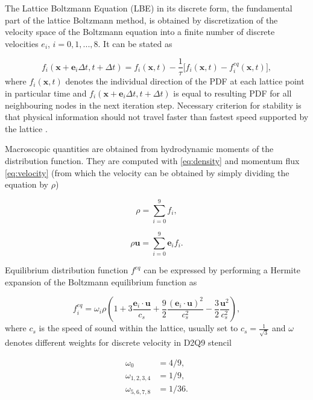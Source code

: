 The Lattice Boltzmann Equation (LBE) in its discrete form, the fundamental part of the lattice Boltzmann method, is obtained by discretization of the velocity space of the Boltzmann equation into a finite number of discrete velocities $e_i$, $i = 0,1,...,8$. It can be stated as

\begin{equation}
	\label{eq:lbe-bgk}
	f_i (\bm{x}+\bm{e}_i\Delta t,t+\Delta t) = f_i (\bm{x},t)-\frac{1}{\tau}\Big[f_i (\bm{x},t) - f_i^{eq} (\bm{x},t)\Big],
\end{equation}
where $f_i (\bm{x},t)$ denotes the individual direction of the PDF at each lattice point in particular time and $f_i (\bm{x}+\bm{e}_i\Delta t,t+\Delta t)$ is equal to resulting PDF for all neighbouring nodes in the next iteration step. Necessary criterion for stability is that physical information should not travel faster than fastest speed supported by the lattice \cite{succi2001lattice}.

Macroscopic quantities are obtained from hydrodynamic moments of the distribution function. They are computed with \ref{eq:density} and momentum flux \ref{eq:velocity} (from which the velocity can be obtained by simply dividing the equation by $\rho$)

\begin{equation}
	\label{eq:density}
	\rho = \sum_{i=0}^{9}f_i,
\end{equation}

\begin{equation}
	\label{eq:velocity}
	\rho\bm{u} = \sum_{i=0}^{9} \bm{e}_i  f_i .
\end{equation}

Equilibrium distribution function $f^{eq}$ can be expressed by performing a Hermite expansion of the Boltzmann equilibrium function as

\begin{equation}
	\label{eq:feq}
	f_i^{eq} = \omega_i \rho \left( 1+3\frac{\bm{e}_i \cdot \bm{u}}{c_s} + \frac{9}{2}\frac{(\bm{e}_i \cdot \bm{u})^2}{c_s^2}-\frac{3}{2}\frac{\bm{u}^2}{c_s^2}\right),
\end{equation}
where $c_s$ is the speed of sound within the lattice, usually set to $c_s = \frac{1}{\sqrt{3}}$ and $\omega$ denotes different weights for discrete velocity in D2Q9 stencil

\begin{align}
	\label{weights}
	\omega_0 &= 4/9,\\
	\omega_{1,2,3,4} &= 1/9,\\
	\omega_{5,6,7,8} &= 1/36.\\
\end{align}


